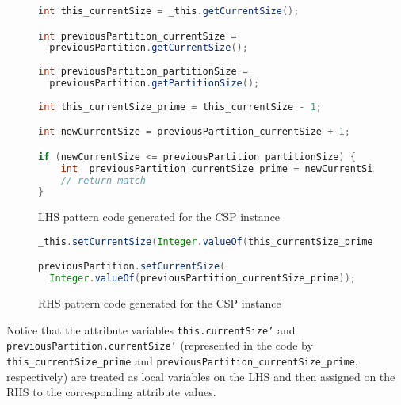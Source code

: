 \begin{figure}[htbp]
\begin{lstlisting}[language=Java, keywordstyle={\bfseries\color{purple}}]
int this_currentSize = _this.getCurrentSize();

int previousPartition_currentSize = 
  previousPartition.getCurrentSize();
  
int previousPartition_partitionSize = 
  previousPartition.getPartitionSize();
  
int this_currentSize_prime = this_currentSize - 1;

int newCurrentSize = previousPartition_currentSize + 1;

if (newCurrentSize <= previousPartition_partitionSize) {
    int  previousPartition_currentSize_prime = newCurrentSize;
    // return match
}
\end{lstlisting}
\caption{LHS pattern code generated for the CSP instance}
\label{ea_CAC_penalizeCardLHS}
\end{figure}
    

\begin{figure}[htbp]
\begin{center}
\begin{lstlisting}[language=Java, keywordstyle={\bfseries\color{purple}}]
_this.setCurrentSize(Integer.valueOf(this_currentSize_prime));

previousPartition.setCurrentSize(
  Integer.valueOf(previousPartition_currentSize_prime));
\end{lstlisting}
\caption{RHS pattern code generated for the CSP instance}  
\label{ea_CAC_penalizeCardRHS}
\end{center}
\end{figure}

Notice that the attribute variables \texttt{this.currentSize'} and \\
\texttt{previousPartition.currentSize'} (represented in the code by \\ 
\texttt{this\_currentSize\_prime} and \texttt{previousPartition\_currentSize\_prime}, respectively) are treated as local variables on the LHS and then assigned on the RHS to the corresponding attribute values.

